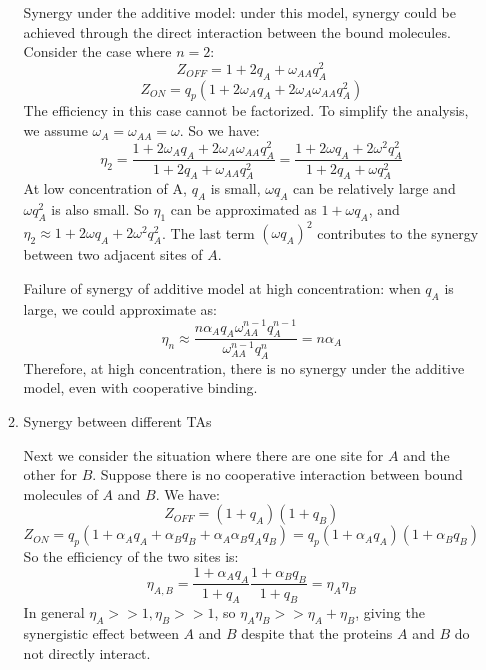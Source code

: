 \documentclass[11pt]{article}
\begin{document}
\begin{enumerate}
\begin{enumerate}
Synergy under the additive model: under this model, synergy could be achieved through the direct interaction between the bound molecules. Consider the case where $n = 2$:  
\begin{equation}
Z_{OFF} = 1 + 2 q_A + \omega_{AA} q_A^2
\end{equation}
\begin{equation}
Z_{ON} = q_p (1 + 2 \omega_A q_A + 2 \omega_A \omega_{AA} q_A^2)
\end{equation}
The efficiency in this case cannot be factorized. To simplify the analysis, we assume $\omega_A = \omega_{AA} = \omega$. So we have:
\begin{equation}
\eta_{2} = \frac{1 + 2 \omega_A q_A + 2 \omega_A \omega_{AA} q_A^2}{1 + 2 q_A + \omega_{AA} q_A^2} = \frac{1 + 2 \omega q_A + 2 \omega^2 q_A^2}{1 + 2 q_A + \omega q_A^2}
\end{equation}
At low concentration of A, $q_A$ is small, $\omega q_A$ can be relatively large and $\omega q_A^2$ is also small. So $\eta_1$ can be approximated as $1 + \omega q_A$, and $\eta_{2} \approx 1 + 2 \omega q_A + 2 \omega^2 q_A^2$. The last term $(\omega q_A)^2$ contributes to the synergy between two adjacent sites of $A$. 

Failure of synergy of additive model at high concentration: when $q_A$ is large, we could approximate as:
\begin{equation}
\eta_n \approx \frac{n \alpha_A q_A \omega_{AA}^{n-1} q_A^{n-1}}{\omega_{AA}^{n-1} q_A^n} = n \alpha_A
\end{equation}
Therefore, at high concentration, there is no synergy under the additive model, even with cooperative binding. 

\item{Synergy between different TAs}

Next we consider the situation where there are one site for $A$ and the other for $B$. Suppose there is no cooperative interaction between bound molecules of $A$ and $B$. We have: 
\begin{equation}
Z_{OFF} = (1+q_A) (1+q_B)
\end{equation}
\begin{equation}
Z_{ON} = q_p (1 + \alpha_A q_A + \alpha_B q_B + \alpha_A \alpha_B q_A q_B) = q_p (1 + \alpha_A q_A) (1 + \alpha_B q_B)
\end{equation}
So the efficiency of the two sites is: 
\begin{equation}
\eta_{A,B} = \frac{1 + \alpha_A q_A}{1 + q_A} \frac{1 + \alpha_B q_B}{1 + q_B} = \eta_A \eta_B
\end{equation}
In general $\eta_A >> 1, \eta_B >>1$, so $\eta_A \eta_B >> \eta_A + \eta_B$, giving the synergistic effect between $A$ and $B$ despite that the proteins $A$ and $B$ do not directly interact. 


\end{enumerate}
\end{enumerate}
\end{document}

